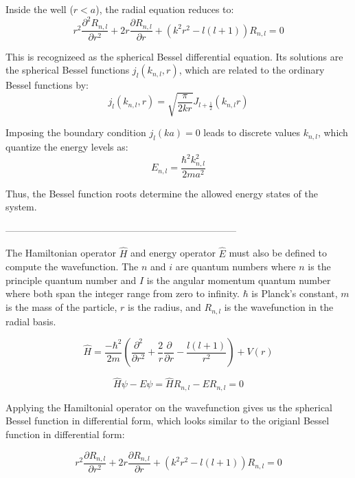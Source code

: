 \documentclass[linenumbers, twocolumn]{aastex631}
\begin{document}
\noindent Inside the well ($r<a$), the radial equation reduces to:
\begin{equation}
    r^2\frac{\partial^2 R_{n,l}}{\partial r^2} + 2r\frac{\partial R_{n,l}}{\partial r} +(k^2r^2-l(l+1))R_{n,l}=0
\end{equation}

\noindent This is recognizeed as the spherical Bessel differential equation.
Its solutions are the spherical Bessel functions $j_l(k_{n,l},r)$, which are related
to the ordinary Bessel functions by:
\begin{equation}
    j_l(k_{n,l},r)=\sqrt{\frac{\pi}{2kr}}J_{l+\frac{1}{2}}(k_{n,l}r)
\end{equation}

\noindent Imposing the boundary condition $j_l(ka)=0$ leads to discrete values $k_{n,l}$,
which quantize the energy levels as:
\begin{equation}
    E_{n,l}=\frac{\hbar^2k_{n,l}^2}{2ma^2}
\end{equation}

Thus, the Bessel function roots determine the allowed energy states of the system.


------------------------------------------------------------------------

The Hamiltonian operator $\hat{H}$ and energy operator $\hat{E}$ must also be
defined to compute the wavefunction. The $n$ and $i$ are quantum numbers where $n$
is the principle quantum number and $I$ is the angular momentum quantum number where
both span the integer range from zero to infinity. $\hbar$ is Planck's constant, $m$
is the mass of the particle, $r$ is the radius, and $R_{n,l}$ is the wavefunction in
the radial basis.

\begin{equation}
    \hat{H}=\frac{-\hbar ^2}{2m}\left(\frac{\partial^2}{\partial r^2} + \frac{2}{r} \frac{\partial}{\partial r} - \frac{l(l+1)}{r^2}\right) +V(r)
\end{equation}

\begin{equation}
    \hat{H}\psi-E\psi=\hat{H}R_{n,l}-ER_{n,l}=0
\end{equation}

\noindent Applying the Hamiltonial operator on the wavefunction gives us the
spherical Bessel function in differential form, which looks similar to the
origianl Bessel function in differential form:

\begin{equation}
    r^2\frac{\partial R_{n,l}}{\partial r^2} + 2r\frac{\partial R_{n,l}}{\partial r} +(k^2r^2-l(l+1))R_{n,l}=0
\end{equation}
\end{document}
